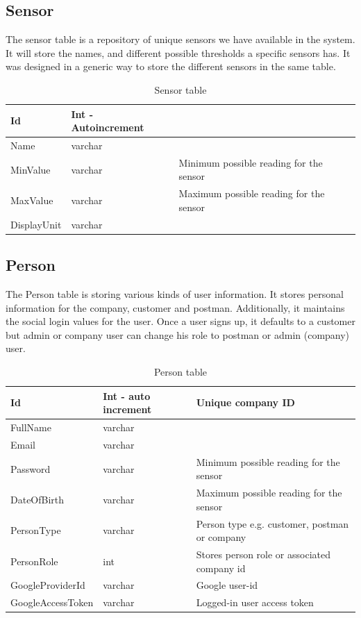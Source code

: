\subsection{Sensor}
The sensor table is a repository of unique sensors we have available in the system. It will store the names, and different possible thresholds a specific sensors has. It was designed in a generic way to store the different sensors in the same table. 




\begin{table}[!ht]
	\small
	\centering
	\begin{tabular}{ |l|l|l| }
		\hline
		Id  & Int - Autoincrement  & \\
		\hline
		Name  & varchar & \\
		\hline
		MinValue & varchar & Minimum possible reading for the sensor  \\
		\hline
		MaxValue & varchar & Maximum possible reading for the sensor\\
		\hline
		DisplayUnit  & varchar & \\
		\hline
	\end{tabular}
	\caption{Sensor table}
\end{table}


\subsection{Person}
The Person table is storing various kinds of user information. It stores personal information for the company, customer and postman. Additionally, it maintains the social login values for the user. Once a user signs up, it defaults to a customer but admin or company user can change his role to postman or admin (company) user. 

\begin{table}[!ht]
    \begin{center}
    \begin{tabular}{ |l|l|l| } 
    \hline
    Id & Int - auto increment & Unique company ID \\
    \hline
    FullName & varchar & \\
    \hline
    Email  & varchar & \\
     \hline
    Password & varchar & Minimum possible reading for the sensor \\
     \hline
    DateOfBirth & varchar & Maximum possible reading for the sensor \\
     \hline
    PersonType & varchar & Person type e.g. customer, postman or company \\
    \hline
    PersonRole & int & Stores person role or associated company id \\
    \hline
    GoogleProviderId & varchar & Google user-id \\
    \hline
    GoogleAccessToken & varchar & Logged-in user access token\\
    \hline
    \end{tabular}
    \end{center}
    \caption{Person table}
\end{table}



